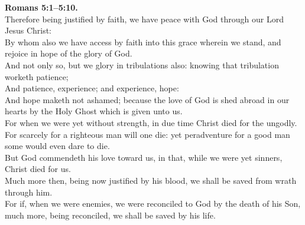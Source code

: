 \documentclass[10pt]{article} %
\begin{document}
{\begin{minipage}[t]{0.45\textwidth}
\textbf{Romans 5:1--5:10.}\\
Therefore being justified by faith, we have peace with God through our Lord Jesus Christ:\\
By whom also we have access by faith into this grace wherein we stand, and rejoice in hope of the glory of God.\\
And not only so, but we glory in tribulations also: knowing that tribulation worketh patience;\\
And patience, experience; and experience, hope:\\
And hope maketh not ashamed; because the love of God is shed abroad in our hearts by the Holy Ghost which is given unto us.\\
For when we were yet without strength, in due time Christ died for the ungodly.\\
For scarcely for a righteous man will one die: yet peradventure for a good man some would even dare to die.\\
But God commendeth his love toward us, in that, while we were yet sinners, Christ died for us.\\
Much more then, being now justified by his blood, we shall be saved from wrath through him.\\
For if, when we were enemies, we were reconciled to God by the death of his Son, much more, being reconciled, we shall be saved by his life.\\

\end{minipage}}
\vspace*{\fill}
\newpage
\Huge%
\vspace*{\fill}
\begin{spacing}{0.9}%
\end{spacing}
\vspace*{\fill}
\end{document}
